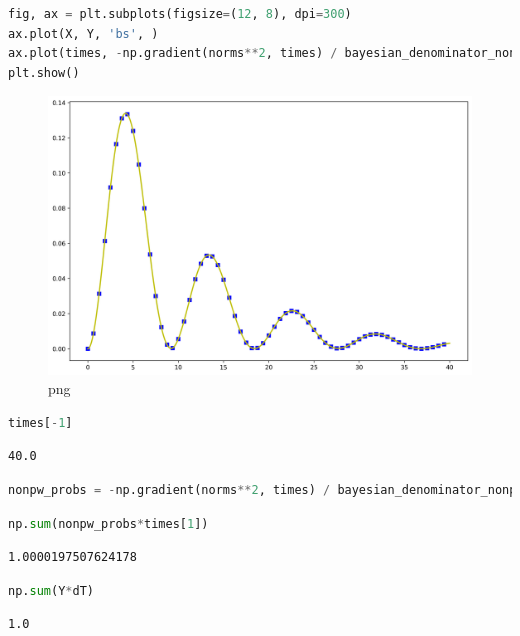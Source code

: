 \begin{lstlisting}[language=Python]
fig, ax = plt.subplots(figsize=(12, 8), dpi=300)
ax.plot(X, Y, 'bs', )
ax.plot(times, -np.gradient(norms**2, times) / bayesian_denominator_nonpw, c='y', linewidth=2)
plt.show()
\end{lstlisting}

\begin{figure}
\centering
\includegraphics[width=0.666\linewidth]{tex/appendix/nb/jupyter/3lev/output_71_0.png}
\caption{png}
\end{figure}

\begin{lstlisting}[language=Python]
times[-1]
\end{lstlisting}

\begin{lstlisting}
40.0
\end{lstlisting}

\begin{lstlisting}[language=Python]
nonpw_probs = -np.gradient(norms**2, times) / bayesian_denominator_nonpw
\end{lstlisting}

\begin{lstlisting}[language=Python]
np.sum(nonpw_probs*times[1])
\end{lstlisting}

\begin{lstlisting}
1.0000197507624178
\end{lstlisting}

\begin{lstlisting}[language=Python]
np.sum(Y*dT)
\end{lstlisting}

\begin{lstlisting}
1.0
\end{lstlisting}

\begin{lstlisting}[language=Python]
\end{lstlisting}
